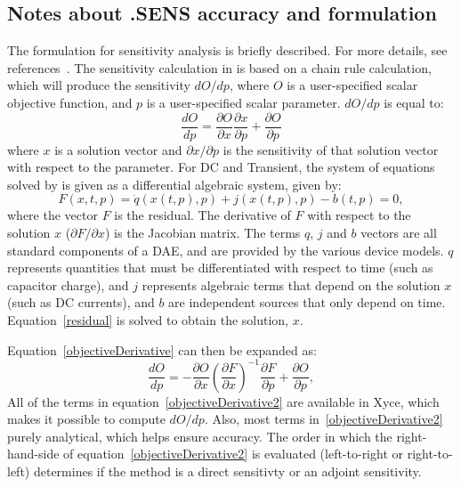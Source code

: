 \subsection{Notes about .SENS accuracy and formulation}

The formulation for \Xyce{} sensitivity analysis is briefly described.  For more details, see
references~\cite{KeiterGradEnhnacedPCE2016,KeiterUQ2019}.
The sensitivity calculation in \Xyce{} is based on a chain rule
calculation, which will produce the sensitivity $dO/dp$, where
$O$ is a user-specified scalar objective function, and $p$ is a
user-specified scalar parameter.  $dO/dp$ is equal to:
\begin{equation}
  \frac{dO}{dp} = \frac{\partial O}{\partial x}\frac{\partial x}{\partial p} + \frac{\partial O}{\partial p}
  \label{objectiveDerivative}
\end{equation}
\noindent where $x$ is a solution vector and $\partial x/\partial p$
is the sensitivity of that solution vector with respect to the
parameter.  
For DC and Transient, the system of equations solved by \Xyce{} is given as a differential algebraic system, given by:
\begin{equation}
  F(x,t,p) = \dot{q}(x(t,p),p) + j(x(t,p),p) - b(t,p) = 0,
  \label{residual}
\end{equation}
where the vector $F$ is the \Xyce{} residual. The derivative of $F$ with 
respect to the solution $x$ ($\partial F/\partial x$) is the Jacobian matrix.
The terms $q$, $j$ and $b$ vectors are all standard components of a DAE, and are provided by
the various device models.  $q$ represents quantities that must be
differentiated with respect to time (such as capacitor charge), and
$j$ represents algebraic terms that depend on the solution $x$ (such
as DC currents), and $b$ are independent sources that only depend on
time.  Equation~\ref{residual} is solved to obtain the solution, $x$.

Equation~\ref{objectiveDerivative} can then be expanded as:
\begin{equation}
  \frac{dO}{dp} = -\frac{\partial O}{\partial x} \left(\frac{\partial F}{\partial x} \right)^{-1} \frac{\partial F}{\partial p} + \frac{\partial O}{\partial p}, {}  
  \label{objectiveDerivative2}
\end{equation}
All of the terms in equation~\ref{objectiveDerivative2} are available in Xyce, which makes it possible to compute $dO/dp$.   
Also, most terms in~\ref{objectiveDerivative2} purely analytical, which helps ensure accuracy. 
The order in which the right-hand-side of equation~\ref{objectiveDerivative2} is evaluated 
(left-to-right or right-to-left) determines if the method is a direct sensitivty or an 
adjoint sensitivity.

